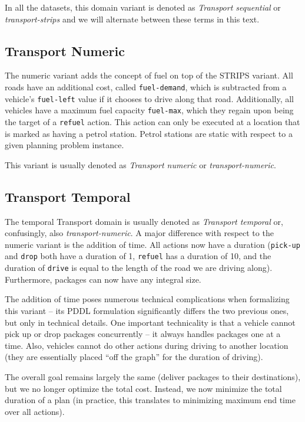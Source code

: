 In all the datasets, this domain variant is denoted as \textit{Transport sequential}
or \textit{transport-strips} and we will alternate between these terms in this text.

\subsection{Transport Numeric}\label{transport-numeric}

The numeric variant adds the concept of fuel on top of the STRIPS variant.
All roads have an additional cost, called \verb+fuel-demand+, which is
subtracted from a vehicle's \verb+fuel-left+ value if it chooses to drive along that road.
Additionally, all vehicles have a maximum fuel capacity \verb+fuel-max+,
which they regain upon being the target of a \verb+refuel+ action. This action can only
be executed at a location that is marked as having a petrol station. Petrol stations
are static with respect to a given planning problem instance.

This variant is usually denoted as \textit{Transport numeric} or \textit{transport-numeric}.

\subsection{Transport Temporal}\label{transport-temporal}

The temporal Transport domain is usually denoted as \textit{Transport temporal} or, confusingly,
also \textit{transport-numeric}. A major difference with respect to the numeric variant is
the addition of time. All actions now have a duration (\verb+pick-up+ and \verb+drop+ both have a
duration of 1, \verb+refuel+ has a duration of 10, and the duration of \verb+drive+ is
equal to the length of the road we are driving along). Furthermore, packages can now have any integral size.

The addition of time poses numerous technical complications when formalizing this variant
-- its PDDL formulation significantly differs the two previous ones, but only in technical details.
One important technicality is that a vehicle cannot pick up or drop packages concurrently -- it always handles packages one at a time. Also, vehicles cannot do other actions during driving to another location (they are essentially placed ``off the graph'' for the duration of driving).

The overall goal remains largely the same (deliver packages to their destinations), but we no longer optimize the total cost. Instead, we now minimize the total duration of a plan (in practice, this translates to minimizing
maximum end time over all actions).



